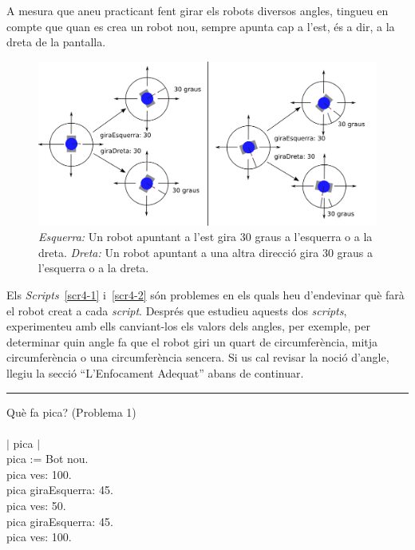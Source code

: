 A mesura que aneu practicant fent girar els robots diversos angles, tingueu en compte que quan es crea un robot nou, sempre apunta cap a l'est, és a dir, a la dreta de la pantalla.

\begin{figure}[h!]
\begin{center}
\includegraphics[scale=0.25]{Imatges/figura4-1}
\end{center}
\caption{\emph{Esquerra:} Un robot apuntant a l'est gira 30 graus a l'esquerra o a la dreta.
\emph{Dreta:} Un robot apuntant a una altra direcció gira 30 graus a l'esquerra o a la dreta.}
\label{fig0401}
\end{figure}

\newpage

\begin{center}
\colorbox{black}{}
\end{center}
{\small
\noindent
Els \emph{Scripts}~\ref{scr4-1} i~\ref{scr4-2} són problemes en els quals heu d'endevinar què farà el robot creat a cada \emph{script}. Després que estudieu aquests dos \emph{scripts}, experimenteu amb ells canviant-los els valors dels angles, per exemple, per determinar quin angle fa que el robot giri un quart de circumferència, mitja circumferència o una circumferència sencera. Si us cal revisar la noció d'angle, llegiu la secció ``L'Enfocament Adequat'' abans de continuar.}\\
\noindent
\rule{\textwidth}{3pt}

\begin{script}  Què fa pica? (Problema 1)
\noindent
\textsf{\upshape
\\
\\$|$ pica $|$\\
pica := Bot nou.\\
pica ves: 100.\\
pica giraEsquerra: 45.\\
pica ves: 50.\\
pica giraEsquerra: 45.\\
pica ves: 100.\\
}
\label{scr4-1}
\end{script}

